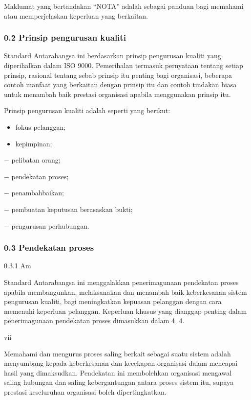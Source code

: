 \documentclass[
]{article}
\providecommand{\tightlist}{%
  \setlength{\itemsep}{0pt}\setlength{\parskip}{0pt}}
\begin{document}
Maklumat yang bertandakan ``NOTA'' adalah sebagai panduan bagi memahami
atau memperjelaskan keperluan yang berkaitan.

\hypertarget{prinsip-pengurusan-kualiti}{%
\subsubsection{0.2 Prinsip pengurusan
kualiti}\label{prinsip-pengurusan-kualiti}}

Standard Antarabangsa ini berdasarkan prinsip pengurusan kualiti yang
diperihalkan dalam ISO 9000. Pemerihalan termasuk pernyataan tentang
setiap prinsip, rasional tentang sebab prinsip itu penting bagi
organisasi, beberapa contoh manfaat yang berkaitan dengan prinsip itu
dan contoh tindakan biasa untuk menambah baik prestasi organisasi
apabila menggunakan prinsip itu.

Prinsip pengurusan kualiti adalah seperti yang berikut:

\begin{itemize}
\tightlist
\item
  fokus pelanggan;
\item
  kepimpinan;
\end{itemize}

− pelibatan orang;

− pendekatan proses;

− penambahbaikan;

− pembuatan keputusan berasaskan bukti;

− pengurusan perhubungan.

\hypertarget{pendekatan-proses}{%
\subsubsection{0.3 Pendekatan proses}\label{pendekatan-proses}}

0.3.1 Am

Standard Antarabangsa ini menggalakkan penerimagunaan pendekatan proses
apabila membangunkan, melaksanakan dan menambah baik keberkesanan sistem
pengurusan kualiti, bagi meningkatkan kepuasan pelanggan dengan cara
memenuhi keperluan pelanggan. Keperluan khusus yang dianggap penting
dalam penerimagunaan pendekatan proses dimasukkan dalam 4 .4.

vii

Memahami dan mengurus proses saling berkait sebagai suatu sistem adalah
menyumbang kepada keberkesanan dan kecekapan organisasi dalam mencapai
hasil yang dimaksudkan. Pendekatan ini membolehkan organisasi mengawal
saling hubungan dan saling kebergantungan antara proses sistem itu,
supaya prestasi keseluruhan organisasi boleh dipertingkatkan.
\end{document}
